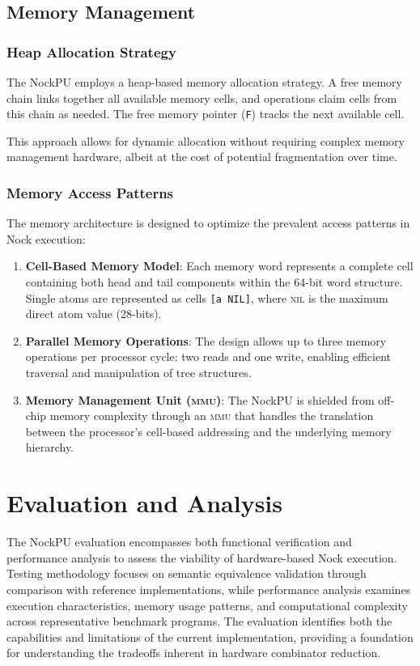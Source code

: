 \documentclass[twoside]{article}
\begin{document}
\subsection{Memory Management}

\subsubsection{Heap Allocation Strategy}

The NockPU employs a heap-based memory allocation strategy. A free memory chain links together all available memory cells, and operations claim cells from this chain as needed. The free memory pointer (\texttt{F}) tracks the next available cell.

This approach allows for dynamic allocation without requiring complex memory management hardware, albeit at the cost of potential fragmentation over time.

\subsubsection{Memory Access Patterns}

The memory architecture is designed to optimize the prevalent access patterns in Nock execution:

\begin{enumerate}
  \item \textbf{Cell-Based Memory Model}: Each memory word represents a complete cell containing both head and tail components within the 64-bit word structure. Single atoms are represented as cells \texttt{[a NIL]}, where \textsc{nil} is the maximum direct atom value (28-bits).
  \item \textbf{Parallel Memory Operations}: The design allows up to three memory operations per processor cycle: two reads and one write, enabling efficient traversal and manipulation of tree structures.
  \item \textbf{Memory Management Unit (\textsc{mmu})}: The NockPU is shielded from off-chip memory complexity through an \textsc{mmu} that handles the translation between the processor's cell-based addressing and the underlying memory hierarchy.
\end{enumerate}

\section{Evaluation and Analysis}

The NockPU evaluation encompasses both functional verification and performance analysis to assess the viability of hardware-based Nock execution. Testing methodology focuses on semantic equivalence validation through comparison with reference implementations, while performance analysis examines execution characteristics, memory usage patterns, and computational complexity across representative benchmark programs. The evaluation identifies both the capabilities and limitations of the current implementation, providing a foundation for understanding the tradeoffs inherent in hardware combinator reduction.
\end{document}
